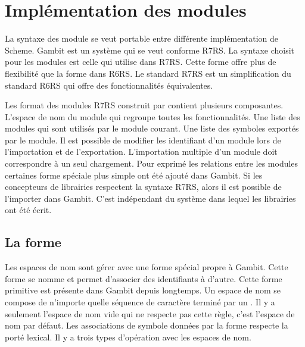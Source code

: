 
\chapter{Implémentation des modules}

La syntaxe des module se veut portable entre différente implémentation de
Scheme.  Gambit est un système qui se veut conforme R7RS.  La syntaxe choisit
pour les modules est celle qui utilise  dans R7RS.
Cette forme offre plus de flexibilité que la forme  dans R6RS.
Le standard R7RS est un simplification du standard R6RS qui offre des
fonctionnalités équivalentes.

Les format des modules R7RS construit par  contient
plusieurs composantes. L'espace de nom du module qui regroupe toutes les
fonctionnalités. Une liste des modules qui sont utilisés par le module courant.
Une liste des symboles exportés par le module. Il est possible de modifier les
identifiant d'un module lors de l'importation et de l'exportation.
L'importation multiple d'un module doit correspondre à un seul chargement.
Pour exprimé les relations entre les modules certaines forme spéciale plus
simple ont été ajouté dans Gambit.  Si les concepteurs de librairies respectent
la syntaxe R7RS, alors il est possible de l'importer dans Gambit. C'est indépendant
du système dans lequel les librairies ont été écrit.





\section{La forme }

Les espaces de nom sont gérer avec une forme spécial propre à Gambit. Cette
forme se nomme  et permet d'associer des identifiants à
d'autre.  Cette forme primitive est présente dans Gambit depuis longtemps.  Un
espace de nom se compose de n'importe quelle séquence de caractère terminé par
un \lstcode{#}. Il y a seulement l'espace de nom vide qui ne respecte pas cette
règle, c'est l'espace de nom par défaut.  Les associations de symbole données
par la forme  respecte la porté lexical. Il y a trois
types d'opération avec les espaces de nom.

